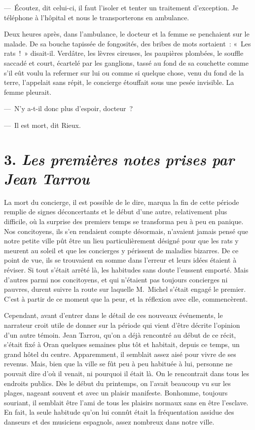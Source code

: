 \documentclass[french,twoside]{book} %
\begin{document}
— Écoutez, dit celui-ci, il faut l’isoler et tenter un traitement d’exception. Je téléphone à l’hôpital et nous le transporterons en ambulance.\par
Deux heures après, dans l’ambulance, le docteur et la femme se penchaient sur le malade. De sa bouche tapissée de fongosités, des bribes de mots sortaient : « Les rats ! » disait-il. Verdâtre, les lèvres cireuses, les paupières plombées, le souffle saccadé et court, écartelé par les ganglions, tassé au fond de sa couchette comme s’il eût voulu la refermer sur lui ou comme si quelque chose, venu du fond de la terre, l’appelait sans répit, le concierge étouffait sous une pesée invisible. La femme pleurait.\par
— N’y a-t-il donc plus d’espoir, docteur ?\par
— Il est mort, dit Rieux.
\section[{3. Les premières notes prises par Jean Tarrou}]{3. \emph{Les premières notes prises par Jean Tarrou}}
\noindent La mort du concierge, il est possible de le dire, marqua la fin de cette période remplie de signes déconcertants et le début d’une autre, relativement plus difficile, où la surprise des premiers temps se transforma peu à peu en panique. Nos concitoyens, ils s’en rendaient compte désormais, n’avaient jamais pensé que notre petite ville pût être un lieu particulièrement désigné pour que les rats y meurent au soleil et que les concierges y périssent de maladies bizarres. De ce point de vue, ils se trouvaient en somme dans l’erreur et leurs idées étaient à réviser. Si tout s’était arrêté là, les habitudes sans doute l’eussent emporté. Mais d’autres parmi nos concitoyens, et qui n’étaient pas toujours concierges ni pauvres, durent suivre la route sur laquelle M. Michel s’était engagé le premier. C’est à partir de ce moment que la peur, et la réflexion avec elle, commencèrent.\par
Cependant, avant d’entrer dans le détail de ces nouveaux événements, le narrateur croit utile de donner sur la période qui vient d’être décrite l’opinion d’un autre témoin. Jean Tarrou, qu’on a déjà rencontré au début de ce récit, s’était fixé à Oran quelques semaines plus tôt et habitait, depuis ce temps, un grand hôtel du centre. Apparemment, il semblait assez aisé pour vivre de ses revenus. Mais, bien que la ville se fût peu à peu habituée à lui, personne ne pouvait dire d’où il venait, ni pourquoi il était là. On le rencontrait dans tous les endroits publics. Dès le début du printemps, on l’avait beaucoup vu sur les plages, nageant souvent et avec un plaisir manifeste. Bonhomme, toujours souriant, il semblait être l’ami de tous les plaisirs normaux sans en être l’esclave. En fait, la seule habitude qu’on lui connût était la fréquentation assidue des danseurs et des musiciens espagnols, assez nombreux dans notre ville.\par
\end{document}
